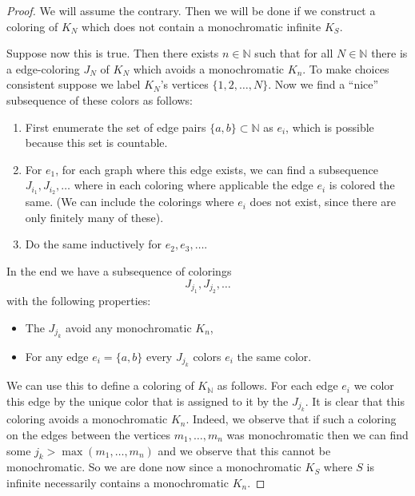\begin{proof}
We will assume the contrary. Then we will be done if we construct a coloring of $K_N$ which does not contain a monochromatic infinite $K_S$.

Suppose now this is true. Then there exists $n \in \mathbb{N}$ such that for all $N \in \mathbb{N}$ there is a edge-coloring $J_N$ of $K_N$ which avoids a monochromatic $K_n$. To make choices consistent suppose we label $K_N$'s vertices $\{1, 2, \dots, N\}$. Now we find a ``nice'' subsequence of these colors as follows:

\begin{enumerate}
	\item First enumerate the set of edge pairs $\{a, b\} \subset \mathbb{N}$ as $e_i$, which is possible because this set is countable. 
	\item For $e_1$, for each graph where this edge exists, we can find a subsequence $J_{i_1}, J_{i_2}, \dots$ where in each coloring where applicable the edge $e_i$ is colored the same. (We can include the colorings where $e_i$ does not exist, since there are only finitely many of these).
	\item Do the same inductively for $e_2, e_3, \dots$.
\end{enumerate}
In the end we have a subsequence of colorings
\[J_{j_1}, J_{j_2}, \dots\]
with the following properties:
\begin{itemize}
	\item The $J_{j_k}$ avoid any monochromatic $K_n$,
	\item For any edge $e_i = \{a, b\}$ every $J_{j_k}$ colors $e_i$ the same color.
\end{itemize}

We can use this to define a coloring of $K_\mathbb{N}$ as follows. For each edge $e_i$ we color this edge by the unique color that is assigned to it by the $J_{j_k}$. It is clear that this coloring avoids a monochromatic $K_n$. Indeed, we observe that if such a coloring on the edges between the vertices $m_1, \dots, m_n$ was monochromatic then we can find some $j_k > \max(m_1, \dots, m_n)$ and we observe that this cannot be monochromatic. So we are done now since a monochromatic $K_S$ where $S$ is infinite necessarily contains a monochromatic $K_n$.
\end{proof}